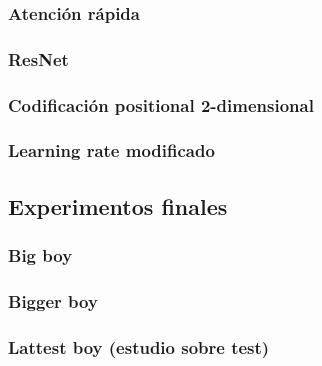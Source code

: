 \documentclass[a4paper, 20pt, dvipsnames]{article}
\begin{document}
\subsubsection{Atención rápida}

\subsubsection{ResNet}

\subsubsection{Codificación positional 2-dimensional}

\subsubsection{Learning rate modificado}

\subsection{Experimentos finales}

\subsubsection{Big boy}

\subsubsection{Bigger boy}

\subsubsection{Lattest boy (estudio sobre test)}








\printbibliography
\end{document}
